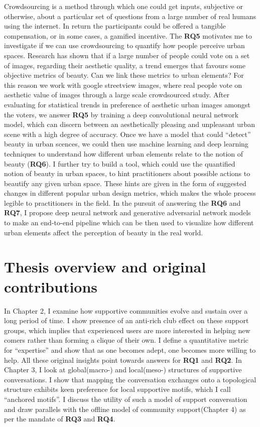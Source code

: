 Crowdsourcing is a method through which one could get inputs, subjective or otherwise, about a particular set of questions from a large number of real humans using the internet. In return the participants could be offered a tangible compensation, or in some cases, a gamified incentive. 
The \textbf{RQ5} motivates me to investigate if we can use crowdsourcing to quantify how people perceive urban spaces. Research has shown that if a large number of people could vote on a set of images, regarding their aesthetic quality, a trend emerges that favours some objective metrics of beauty\cite{datta2008algorithmic,quercia2014aesthetic}. Can we link these metrics to urban elements? For this reason we work with google streetview images, where real people vote on aesthetic value of images through a large scale crowdsourced study. After evaluating for statistical trends in preference of aesthetic urban images amongst the voters, we answer \textbf{RQ5} by training a deep convolutional neural network model, which can discern between an aesthetically pleasing and unpleasant urban scene with a high degree of accuracy. Once we have a model that could ``detect'' beauty in urban scences, we could then use machine learning and deep learning techniques to understand how different urban elements relate to the notion of beauty (\textbf{RQ6}). I further try to build a tool, which could use the quantified notion of beauty in urban spaces, to hint practitioners about possible actions to beautify any given urban space. These hints are given in the form of suggested changes in different popular urban design metrics, which makes the whole process legible to practitioners in the field. In the pursuit of answering the \textbf{RQ6} and  \textbf{RQ7}, I propose deep neural network and generative adversarial network models to make an end-to-end pipeline which can be then used to visualize how different urban elements affect the perception of beauty in the real world.


\section{Thesis overview and original contributions}
In Chapter 2, I examine how supportive communities evolve and sustain over a long period of time. I show presence of an anti-rich club effect on these support groups, which implies that experienced users are more interested in helping new comers rather than forming a clique of their own. I define a quantitative metric for ``expertise'' and show that as one becomes adept, one becomes more willing to help. All these original insights point towards answers for \textbf{RQ1} and \textbf{RQ2}. In Chapter 3, I look at global(macro-) and local(meso-) structures of supportive conversations. I show that mapping the conversation exchanges onto a topological structure exhibits keen preference for local supportive motifs, which I call ``anchored motifs''. I discuss the utility of such a model of support conversation and draw parallels with the offline model of community support(Chapter 4) as per the mandate of \textbf{RQ3} and \textbf{RQ4}. 

